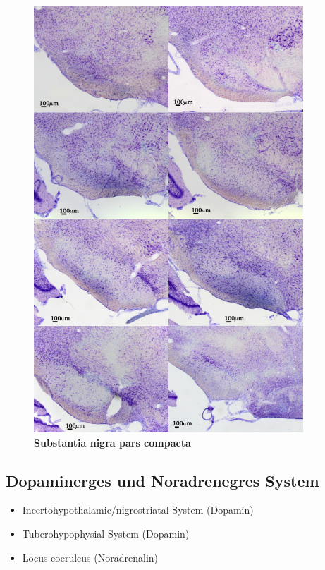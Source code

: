 \documentclass[12pt,a4paper,pdftex]{article}
\begin{document}
\begin{figure}[H]
    \centering
    \includegraphics[width = 0.9\textwidth]{pictures/immu/SNC.png}
    \caption[Substantia nigra pars compacta]{\textbf{Substantia nigra pars compacta}}
    \label{fig:SNC}
\end{figure}

\subsection{Dopaminerges und Noradrenegres System}
\begin{itemize}
    \item Incertohypothalamic/nigrostriatal System (Dopamin)
    \item Tuberohypophysial System (Dopamin)
    \item Locus coeruleus (Noradrenalin)
\end{itemize}
\end{document}
